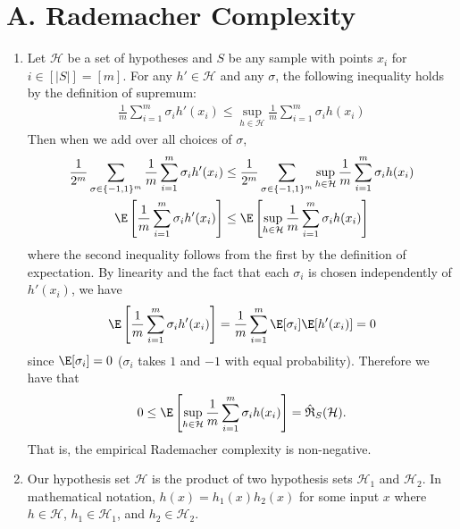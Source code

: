 
\section*{A. Rademacher Complexity}
\medskip

\begin{enumerate}
    \item 
    Let $\mathcal{H}$ be a set of hypotheses
    and $S$ be any sample with points $x_i$ for
    $i \in [|S|]=[m]$.
    For any $h' \in \mathcal{H}$ and any $\sigma$,
    the following inequality holds
    by the definition of supremum:
    \begin{align}
        \frac{1}{m}\sum_{i=1}^m\sigma_i h'(x_i)
        \leq \sup_{h \in \mathcal{H}}
        \frac{1}{m}\sum_{i=1}^m\sigma_i h(x_i)
        \nonumber
    \end{align}
    Then when we add over all choices of $\sigma$,
    \begin{align}
        \frac{1}{2^m} \sum_{\sigma \in \{-1,1\}^m}
        \frac{1}{m}\sum_{i=1}^m\sigma_i h'(x_i)
        &\leq 
        \frac{1}{2^m} \sum_{\sigma \in \{-1,1\}^m}
        \sup_{h \in \mathcal{H}}
        \frac{1}{m}\sum_{i=1}^m\sigma_i h(x_i)
        \nonumber \\
        \E \left[
        \frac{1}{m}\sum_{i=1}^m\sigma_i h'(x_i) \right]
        &\leq 
        \E \left[
        \sup_{h \in \mathcal{H}}
        \frac{1}{m}\sum_{i=1}^m\sigma_i h(x_i) \right]
        \nonumber
    \end{align}
    where the second inequality follows from the first
    by the definition of expectation.
    By linearity and the fact that each $\sigma_i$
    is chosen independently of $h'(x_i)$, we have
    \begin{align}
        \E \left[
        \frac{1}{m}\sum_{i=1}^m\sigma_i h'(x_i) \right]
        = \frac{1}{m} \sum_{i=1}^m \E[\sigma_i]
        \E[h'(x_i)]
        = 0
        \nonumber
    \end{align}
    since $\E[\sigma_i] = 0$ ($\sigma_i$ takes
    $1$ and $-1$ with equal probability).
    Therefore we have that
    \begin{align} 
        0 \leq 
        \E \left[
        \sup_{h \in \mathcal{H}}
        \frac{1}{m}\sum_{i=1}^m\sigma_i h(x_i) \right]
        = \hat{\mathfrak{R}}_S(\mathcal{H}).
        \nonumber   
    \end{align}
    That is, the empirical Rademacher complexity is
    non-negative.
    \item Our hypothesis set $\mathcal{H}$ is the product
    of two hypothesis sets $\mathcal{H}_1$ and $\mathcal{H}_2$.
    In mathematical notation, $h(x) = h_1(x)h_2(x)$ for some
    input $x$ where $h \in \mathcal{H}$, $h_1 \in \mathcal{H}_1$,
    and $h_2 \in \mathcal{H}_2$.


\end{enumerate}

